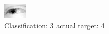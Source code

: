 \begin{figure}[h!]
\begin{center}
\includegraphics[width=0.60\columnwidth]{figures/ID2477_class_3_target_4.png}
\end{center}
\caption{ Classification: 3 actual target: 4}
\label{fig:ID2477_class_3_target_4}
\end{figure}
